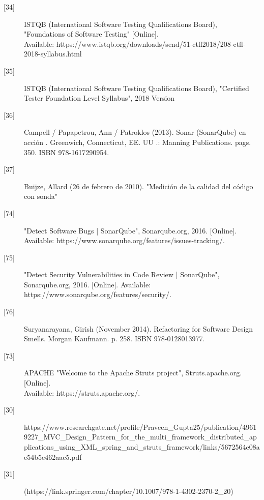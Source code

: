 \begin{description}
		\item[\hypertarget{b34}{[34]}] ISTQB (International Software Testing Qualifications Board), "Foundations of Software Testing" [Online].\\ Available: 
		https://www.istqb.org/downloads/send/51-ctfl2018/208-ctfl-2018-syllabus.html
		
		\item[\hypertarget{b35}{[35]}] ISTQB (International Software Testing Qualifications Board), "Certified Tester
		Foundation Level Syllabus", 2018 Version 
		
		\item[\hypertarget{b36}{[36]}] Campell / Papapetrou, Ann / Patroklos (2013). Sonar (SonarQube) en acción . Greenwich, Connecticut, EE. UU .: Manning Publications. pags. 350. ISBN 978-1617290954.
		
		\item[\hypertarget{b37}{[37]}] Buijze, Allard (26 de febrero de 2010). "Medición de la calidad del código con sonda"  
		
		\item[\hypertarget{b74}{[74]}] "Detect Software Bugs | SonarQube", Sonarqube.org, 2016. [Online].\\ Available: https://www.sonarqube.org/features/issues-tracking/.
		
		\item[\hypertarget{b75}{[75]}] "Detect Security Vulnerabilities in Code Review | SonarQube", Sonarqube.org, 2016. [Online]. Available: https://www.sonarqube.org/features/security/. 
		
		\item[\hypertarget{b76}{[76]}] Suryanarayana, Girish (November 2014). Refactoring for Software Design Smells. Morgan Kaufmann. p. 258. ISBN 978-0128013977.
		
		\item[\hypertarget{b73}{[73]}] APACHE "Welcome to the Apache Struts project", Struts.apache.org. [Online].\\ Available: https://struts.apache.org/. 
				
		\item[\hypertarget{b30}{[30]}] 	https://www.researchgate.net/profile/Praveen\_Gupta25/publication/49619227\_MVC\_Design\_Pattern\_for\_the\_multi\_framework\_distributed\_applications\_using\_XML\_spring\_and\_struts\_framework/links/5672564e08ae54b5e462aac5.pdf
		
		\item[\hypertarget{b31}{[31]}] (https://link.springer.com/chapter/10.1007/978-1-4302-2370-2\_20)
		

\end{description}
